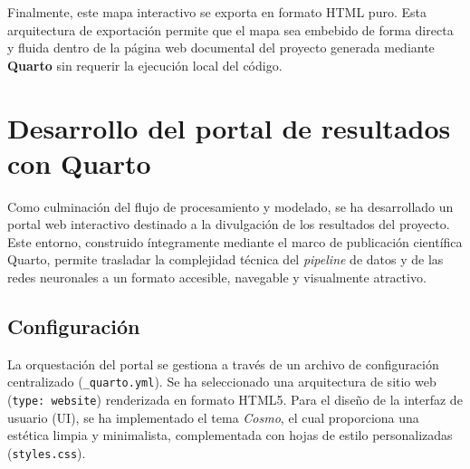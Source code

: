 Finalmente, este mapa interactivo se exporta en formato HTML puro. Esta arquitectura de exportación permite que el mapa sea embebido de forma directa y fluida dentro de la página web documental del proyecto generada mediante \textbf{Quarto} sin requerir la ejecución local del código.






\section{Desarrollo del portal de resultados con Quarto}
\label{sec:portal_quarto}

Como culminación del flujo de procesamiento y modelado, se ha desarrollado un portal web interactivo destinado a la divulgación de los resultados del proyecto. Este entorno, construido íntegramente mediante el marco de publicación científica Quarto, permite trasladar la complejidad técnica del \textit{pipeline} de datos y de las redes neuronales a un formato accesible, navegable y visualmente atractivo.

\subsection{Configuración}
\label{subsec:quarto_config}

La orquestación del portal se gestiona a través de un archivo de configuración centralizado (\texttt{\_quarto.yml}). Se ha seleccionado una arquitectura de sitio web (\texttt{type: website}) renderizada en formato HTML5. Para el diseño de la interfaz de usuario (UI), se ha implementado el tema \textit{Cosmo}, el cual proporciona una estética limpia y minimalista, complementada con hojas de estilo personalizadas (\texttt{styles.css}).

